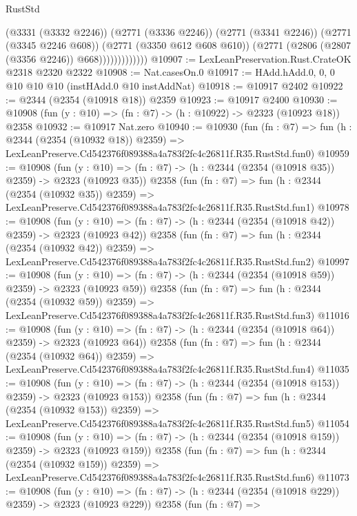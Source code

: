 \begin{lexlean}{RustStd}
\begin{coremodule}
                          (@3331 (@3332 @2246))
                          (@2771 (@3336 @2246))
                          (@2771 (@3341 @2246))
                          (@2771 (@3345 @2246 @608))
                          (@2771 (@3350 @612 @608 @610))
                          (@2771 (@2806 (@2807 (@3356 @2246)) @668)))))))))))))
@10907 := LexLeanPreservation.Rust.CrateOK @2318 @2320 @2322
@10908 := Nat.casesOn.{0}
@10917 := HAdd.hAdd.{0, 0, 0} @10 @10 @10 (instHAdd.{0} @10 instAddNat)
@10918 := @10917 @2402
@10922 := @2344 (@2354 (@10918 @18)) @2359
@10923 := @10917 @2400
@10930 := @10908 (fun (y : @10) => (fn : @7) -> (h : @10922) -> @2323 (@10923 @18)) @2358
@10932 := @10917 Nat.zero
@10940 := @10930
    (fun (fn : @7) =>
    fun (h : @2344 (@2354 (@10932 @18)) @2359) =>
    LexLeanPreserve.Cd542376f089388a4a783f2fc4c26811f.R35.RustStd.fun0)
@10959 := @10908
    (fun (y : @10) => (fn : @7) -> (h : @2344 (@2354 (@10918 @35)) @2359) -> @2323 (@10923 @35))
    @2358
    (fun (fn : @7) =>
    fun (h : @2344 (@2354 (@10932 @35)) @2359) =>
    LexLeanPreserve.Cd542376f089388a4a783f2fc4c26811f.R35.RustStd.fun1)
@10978 := @10908
    (fun (y : @10) => (fn : @7) -> (h : @2344 (@2354 (@10918 @42)) @2359) -> @2323 (@10923 @42))
    @2358
    (fun (fn : @7) =>
    fun (h : @2344 (@2354 (@10932 @42)) @2359) =>
    LexLeanPreserve.Cd542376f089388a4a783f2fc4c26811f.R35.RustStd.fun2)
@10997 := @10908
    (fun (y : @10) => (fn : @7) -> (h : @2344 (@2354 (@10918 @59)) @2359) -> @2323 (@10923 @59))
    @2358
    (fun (fn : @7) =>
    fun (h : @2344 (@2354 (@10932 @59)) @2359) =>
    LexLeanPreserve.Cd542376f089388a4a783f2fc4c26811f.R35.RustStd.fun3)
@11016 := @10908
    (fun (y : @10) => (fn : @7) -> (h : @2344 (@2354 (@10918 @64)) @2359) -> @2323 (@10923 @64))
    @2358
    (fun (fn : @7) =>
    fun (h : @2344 (@2354 (@10932 @64)) @2359) =>
    LexLeanPreserve.Cd542376f089388a4a783f2fc4c26811f.R35.RustStd.fun4)
@11035 := @10908
    (fun (y : @10) => (fn : @7) -> (h : @2344 (@2354 (@10918 @153)) @2359) -> @2323 (@10923 @153))
    @2358
    (fun (fn : @7) =>
    fun (h : @2344 (@2354 (@10932 @153)) @2359) =>
    LexLeanPreserve.Cd542376f089388a4a783f2fc4c26811f.R35.RustStd.fun5)
@11054 := @10908
    (fun (y : @10) => (fn : @7) -> (h : @2344 (@2354 (@10918 @159)) @2359) -> @2323 (@10923 @159))
    @2358
    (fun (fn : @7) =>
    fun (h : @2344 (@2354 (@10932 @159)) @2359) =>
    LexLeanPreserve.Cd542376f089388a4a783f2fc4c26811f.R35.RustStd.fun6)
@11073 := @10908
    (fun (y : @10) => (fn : @7) -> (h : @2344 (@2354 (@10918 @229)) @2359) -> @2323 (@10923 @229))
    @2358
    (fun (fn : @7) =>

\end{coremodule}
\end{lexlean}
